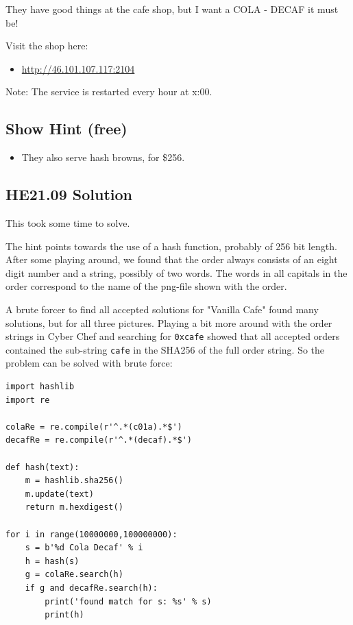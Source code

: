 \documentclass[english,a4paper,nols,noindent]{tufte-handout}
\begin{document}
They have good things at the cafe shop, but I want a COLA - DECAF it must be!

\noindent  Visit the shop here:
\begin{itemize}
\item \url{http://46.101.107.117:2104}
\end{itemize}
Note: The service is restarted every hour at x:00.

\subsection{Show Hint (free)}
\begin{itemize}
\item They also serve hash browns, for \$256.
\end{itemize}

\hypertarget{he21.09-solution}{%
\subsection{HE21.09 Solution}\label{he21.09-solution}}

This took some time to solve.

The hint points towards the use of a hash function, probably of 256 bit length.
After some playing around, we found that the order always consists of an eight
digit number and a string, possibly of two words.  The words in all capitals in
the order correspond to the name of the png-file shown with the order.

A brute forcer to find all accepted solutions for "Vanilla Cafe" found many
solutions, but for all three pictures.  Playing a bit more around with the
order strings in Cyber Chef and searching for \verb+0xcafe+ showed that all
accepted orders contained the sub-string \verb+cafe+ in the SHA256 of the full
order string.  So the problem can be solved with brute force:

\begin{verbatim}
import hashlib
import re

colaRe = re.compile(r'^.*(c01a).*$')
decafRe = re.compile(r'^.*(decaf).*$')

def hash(text):
    m = hashlib.sha256()
    m.update(text)
    return m.hexdigest()

for i in range(10000000,100000000):
    s = b'%d Cola Decaf' % i
    h = hash(s)
    g = colaRe.search(h)
    if g and decafRe.search(h):
        print('found match for s: %s' % s)
        print(h)
\end{verbatim}
\end{document}
